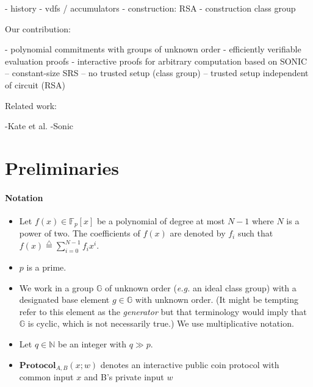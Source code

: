\documentclass{article}
\begin{document}
 - history
 - vdfs / accumulators
 - construction: RSA
 - construction class group

Our contribution:

 - polynomial commitments with groups of unknown order
 - efficiently verifiable evaluation proofs
 - interactive proofs for arbitrary computation based on SONIC
 -- constant-size SRS
 -- no trusted setup (class group)
 -- trusted setup independent of circuit (RSA)

Related work:
	
	-Kate et al.
	-Sonic
\section{Preliminaries}
\paragraph{Notation}
\begin{itemize}
\item Let $f(x) \in \mathbb{F}_p[x]$ be a polynomial of degree at most $N-1$ where $N$ is a power of two. The coefficients of $f(x)$ are denoted by $f_i$ such that $f(x) \stackrel{\triangle}{=} \sum_{i=0}^{N-1} f_i x^i$.
\item $p$ is a prime.
\item We work in a group $\mathbb{G}$ of unknown order (\emph{e.g.} an ideal class group) with a designated base element $g \in \mathbb{G}$ with unknown order. (It might be tempting refer to this element as the \emph{generator} but that terminology would imply that $\mathbb{G}$ is cyclic, which is not necessarily true.) We use multiplicative notation.
\item Let $q \in \mathbb{N}$ be an integer with $q \gg p$.
\item $\textbf{Protocol}_{A,B}(x;w)$ denotes an interactive public coin protocol with common input $x$ and B's private input $w$
\end{itemize}
\end{document}
